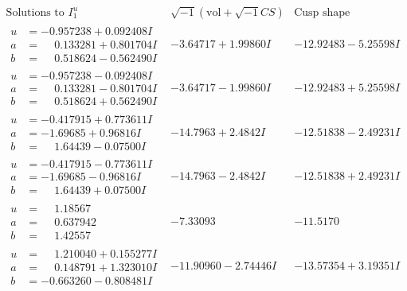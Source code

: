 \documentclass[1p]{elsarticle_modified}
\theoremstyle{definition}
\newcommand{\I}{\sqrt{-1}}
\begin{document}
$$\begin{array}{c|c|c}  
\text{Solutions to }I^u_{1}& \I (\text{vol} + \sqrt{-1}CS) & \text{Cusp shape}\\
 \hline 
\begin{aligned}
u &= -0.957238 + 0.092408 I \\
a &= \phantom{-}0.133281 + 0.801704 I \\
b &= \phantom{-}0.518624 - 0.562490 I\end{aligned}
 & -3.64717 + 1.99860 I & -12.92483 - 5.25598 I \\ \hline\begin{aligned}
u &= -0.957238 - 0.092408 I \\
a &= \phantom{-}0.133281 - 0.801704 I \\
b &= \phantom{-}0.518624 + 0.562490 I\end{aligned}
 & -3.64717 - 1.99860 I & -12.92483 + 5.25598 I \\ \hline\begin{aligned}
u &= -0.417915 + 0.773611 I \\
a &= -1.69685 + 0.96816 I \\
b &= \phantom{-}1.64439 - 0.07500 I\end{aligned}
 & -14.7963 + 2.4842 I & -12.51838 - 2.49231 I \\ \hline\begin{aligned}
u &= -0.417915 - 0.773611 I \\
a &= -1.69685 - 0.96816 I \\
b &= \phantom{-}1.64439 + 0.07500 I\end{aligned}
 & -14.7963 - 2.4842 I & -12.51838 + 2.49231 I \\ \hline\begin{aligned}
u &= \phantom{-}1.18567\phantom{ +0.000000I} \\
a &= \phantom{-}0.637942\phantom{ +0.000000I} \\
b &= \phantom{-}1.42557\phantom{ +0.000000I}\end{aligned}
 & -7.33093\phantom{ +0.000000I} & -11.5170\phantom{ +0.000000I} \\ \hline\begin{aligned}
u &= \phantom{-}1.210040 + 0.155277 I \\
a &= \phantom{-}0.148791 + 1.323010 I \\
b &= -0.663260 - 0.808481 I\end{aligned}
 & -11.90960 - 2.74446 I & -13.57354 + 3.19351 I \\ \hline\begin{aligned}

\end{aligned}
\end{array}$$
\end{document}
